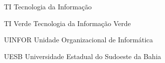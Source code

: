 \begin{siglas}
    \item[TI] Tecnologia da Informação
    \item[TI Verde] Tecnologia da Informação Verde
    \item[UINFOR] Unidade Organizacional de Informática
    \item[UESB] Universidade Estadual do Sudoeste da Bahia
\end{siglas}
